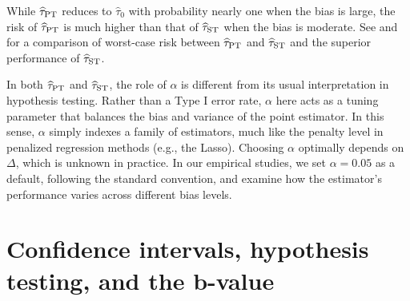 \documentclass[11pt]{article}
\def\cI{{\mathcal I}}
\newcommand{\htau}{\widehat\tau}
\numberwithin{equation}{section}
\theoremstyle{definition}
\begin{document}
While $\htau_{\rm PT}$ reduces to $\htau_0$ with probability nearly one when the bias is large, the risk of $\htau_{\rm PT}$ is much higher than that of $\htau_{\rm ST}$ when the bias is moderate. See \cite{bickel1983minimax} and \cite{armstrong2025adapting} for a comparison of worst-case risk between $\htau_{\rm PT}$ and $\htau_{\rm ST}$ and the superior performance of $\htau_{\rm ST}$.


In both $\htau_{\rm PT}$ and $\htau_{\rm ST}$, the role of $\alpha$ is different from its usual interpretation in hypothesis testing. 
Rather than a Type I error rate, $\alpha$ here acts as a tuning parameter that balances the bias and variance of the point estimator. In this sense, $\alpha$ simply indexes a family of estimators, much like the penalty level in penalized regression methods (e.g., the Lasso). Choosing $\alpha$ optimally depends on $\Delta$, which is unknown in practice. In our empirical studies, we set $\alpha = 0.05$ as a default, following the standard convention, and examine how the estimator’s performance varies across different bias levels.


\section{Confidence intervals, hypothesis testing, and the b-value}\label{sec:confidence}
\end{document}
